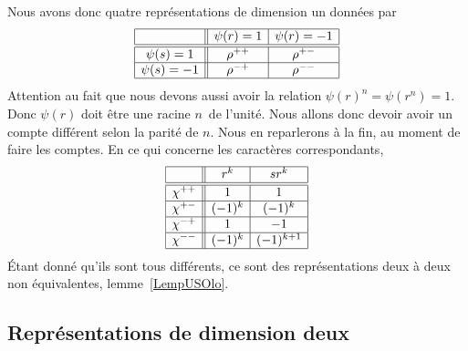 Nous avons donc quatre représentations de dimension un données par
\begin{equation*}
	\begin{array}[]{|c||c|c|}
		\hline
		           & \psi(r)=1 & \psi(r)=-1 \\
		\hline\hline
		\psi(s)=1  & \rho^{++} & \rho^{+-}  \\
		\hline
		\psi(s)=-1 & \rho^{-+} & \rho^{--}  \\
		\hline
	\end{array}
\end{equation*}
Attention au fait que nous devons aussi avoir la relation \( \psi(r)^n=\psi(r^n)=1\). Donc \( \psi(r)\) doit être une racine \( n\)\ieme\ de l'unité. Nous allons donc devoir avoir un compte différent selon la parité de \( n\). Nous en reparlerons à la fin, au moment de faire les comptes. En ce qui concerne les caractères correspondants,
\begin{equation*}
	\begin{array}[]{|c||c|c|}
		\hline
		          & r^k    & sr^k       \\
		\hline\hline
		\chi^{++} & 1      & 1          \\
		\hline
		\chi^{+-} & (-1)^k & (-1)^k     \\
		\hline
		\chi^{-+} & 1      & -1         \\
		\hline
		\chi^{--} & (-1)^k & (-1)^{k+1} \\
		\hline
	\end{array}
\end{equation*}
Étant donné qu'ils sont tous différents, ce sont des représentations deux à deux non équivalentes, lemme~\ref{LempUSOlo}.

\subsection{Représentations de dimension deux}

